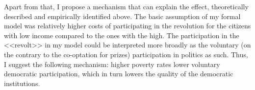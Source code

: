 \documentclass[a4paper, 12pt]{article}
\begin{document}
    \noindent Apart from that, I propose a mechanism that can explain the effect, theoretically described and empirically identified above. The basic assumption of my formal model was relatively higher costs of participating in the revolution for the citizens with low income compared to the ones with the high. The participation in the <<revolt>> in my model could be interpreted more broadly as the voluntary (on the contrary to the co-optation for prizes) participation in politics as such. Thus, I suggest the following mechanism: higher poverty rates lower voluntary democratic participation, which in turn lowers the quality of the democratic institutions. 
    \\
    
        \begin{table}[!htbp] \centering 
  \caption{Mediation analysis auxiliary regressions} 
  \label{mediate} 
\end{table}
\end{document}
